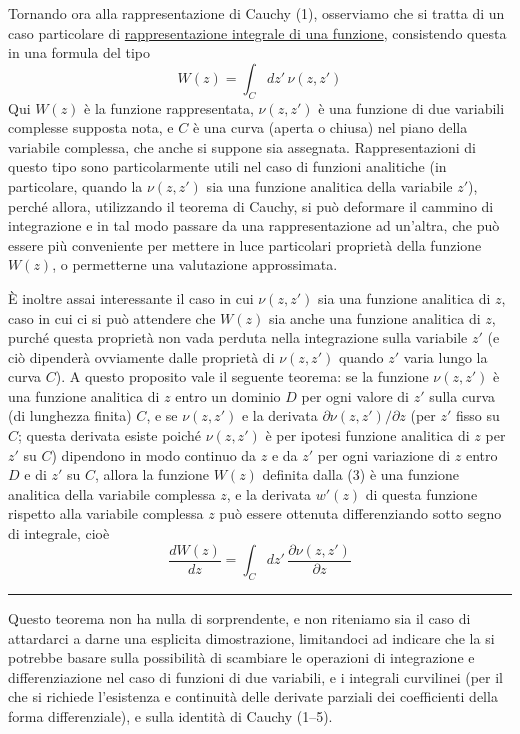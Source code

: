 \documentclass[11pt, a4paper]{book}
\numberwithin{equation}{section}
\begin{document}
Tornando ora alla rappresentazione di Cauchy (1), osserviamo che si tratta di un caso particolare di \uline{rappresentazione integrale di una funzione}, consistendo questa in una formula del tipo
\begin{equation}
W(z) = \int_C dz'\, \nu(z, z') \tag{3}
\end{equation}
Qui $W(z)$ è la funzione rappresentata, $\nu(z, z')$ è una funzione di due variabili complesse supposta nota, e $C$ è una curva (aperta o chiusa) nel piano della variabile complessa, che anche si suppone sia assegnata. Rappresentazioni di questo tipo sono particolarmente utili nel caso di funzioni analitiche (in particolare, quando la $\nu(z, z')$ sia una funzione analitica della variabile $z'$), perché allora, utilizzando il teorema di Cauchy, si può deformare il cammino di integrazione e in tal modo passare da una rappresentazione ad un'altra, che può essere più conveniente per mettere in luce particolari proprietà della funzione $W(z)$, o permetterne una valutazione approssimata.

È inoltre assai interessante il caso in cui $\nu(z, z')$ sia una funzione analitica di $z$, caso in cui ci si può attendere che $W(z)$ sia anche una funzione analitica di $z$, purché questa proprietà non vada perduta nella integrazione sulla variabile $z'$ (e ciò dipenderà ovviamente dalle proprietà di $\nu(z, z')$ quando $z'$ varia lungo la curva $C$). A questo proposito vale il seguente teorema: se la funzione $\nu(z, z')$ è una funzione analitica di $z$ entro un dominio $D$ per ogni valore di $z'$ sulla curva (di lunghezza finita) $C$, e se $\nu(z, z')$ e la derivata $\partial\nu(z,z')/\partial z$ (per $z'$ fisso su $C$; questa derivata esiste poiché $\nu(z,z')$ è per ipotesi funzione analitica di $z$ per $z'$ su $C$) dipendono in modo continuo da $z$ e da $z'$ per ogni variazione di $z$ entro $D$ e di $z'$ su $C$, allora la funzione $W(z)$ definita dalla (3) è una funzione analitica della variabile complessa $z$, e la derivata $w'(z)$ di questa funzione rispetto alla variabile complessa $z$ può essere ottenuta differenziando sotto segno di integrale, cioè
\begin{equation}
\frac{dW(z)}{dz} = \int_C dz'\, \frac{\partial\nu(z,z')}{\partial z} \tag{4}
\end{equation}

\medskip\hrule\medskip

Questo teorema non ha nulla di sorprendente, e non riteniamo sia il caso di attardarci a darne una esplicita dimostrazione, limitandoci ad indicare che la si potrebbe basare sulla possibilità di scambiare le operazioni di integrazione e differenziazione nel caso di funzioni di due variabili, e i integrali curvilinei (per il che si richiede l'esistenza e continuità delle derivate parziali dei coefficienti della forma differenziale), e sulla identità di Cauchy (1--5).
\end{document}
